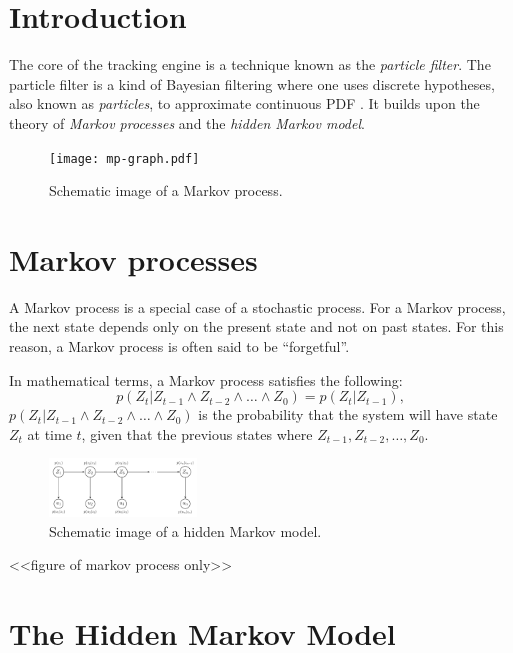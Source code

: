 \section{Introduction}
The core of the tracking engine is a technique known as the \emph{particle filter}. 
The particle filter is a kind of Bayesian filtering where one uses discrete hypotheses, 
also known as \emph{particles}, to approximate continuous PDF \cite{ProbRob}.
It builds upon the theory of \emph{Markov processes} and the \emph{hidden Markov model}.


\begin{figure}
  \centering
  \texttt{[image: mp-graph.pdf]}
  \caption{Schematic image of a Markov process.}
  \label{fig:hmm-graph}
\end{figure}


\section{Markov processes}
A Markov process is a special case of a stochastic process. For a Markov process, 
the next state depends only on the present state and not on past states. 
For this reason, a Markov process is often said to be ``forgetful''.

In mathematical terms, a Markov process satisfies the following:
\begin{equation}
 p\left(Z_t|Z_{t-1} \wedge Z_{t-2} \wedge \dots \wedge Z_0\right) = p\left(Z_t|Z_{t-1}\right),
\end{equation}
$p\left(Z_t|Z_{t-1} \wedge Z_{t-2} \wedge \dots \wedge Z_0\right)$ 
is the probability that the system will have state $Z_t$ at time $t$, 
given that the previous states where $Z_{t-1}, Z_{t-2},\dots, Z_0$.

\begin{figure}
  \centering
  \includegraphics[width=0.35\textwidth]{hmm-graph.pdf}
  \caption{Schematic image of a hidden Markov model.}
  \label{fig:hmm-graph}
\end{figure}

<<figure of markov process only>>

\section{The Hidden Markov Model}

